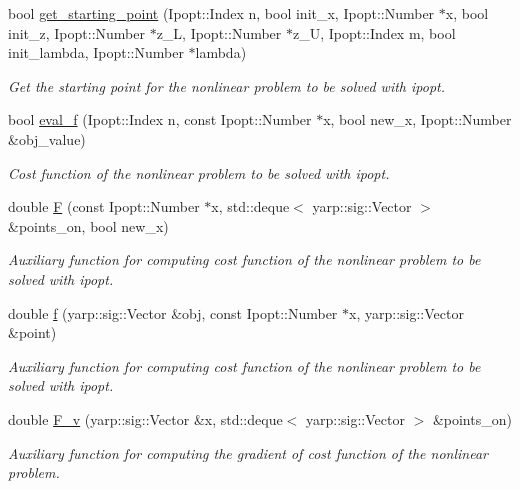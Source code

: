 \begin{DoxyCompactItemize}
bool \hyperlink{classgrasping__NLP_aad767e5f7e77a811e11817ff1d3d179e}{get\+\_\+starting\+\_\+point} (Ipopt\+::\+Index n, bool init\+\_\+x, Ipopt\+::\+Number $\ast$x, bool init\+\_\+z, Ipopt\+::\+Number $\ast$z\+\_\+L, Ipopt\+::\+Number $\ast$z\+\_\+U, Ipopt\+::\+Index m, bool init\+\_\+lambda, Ipopt\+::\+Number $\ast$lambda)
\begin{DoxyCompactList}\small\item\em Get the starting point for the nonlinear problem to be solved with ipopt. \end{DoxyCompactList}\item 
bool \hyperlink{classgrasping__NLP_aaceeaa1991c241e731f12434f3acb44c}{eval\+\_\+f} (Ipopt\+::\+Index n, const Ipopt\+::\+Number $\ast$x, bool new\+\_\+x, Ipopt\+::\+Number \&obj\+\_\+value)
\begin{DoxyCompactList}\small\item\em Cost function of the nonlinear problem to be solved with ipopt. \end{DoxyCompactList}\item 
double \hyperlink{classgrasping__NLP_a1ed524c1fd216594e82a6b066c59ff9c}{F} (const Ipopt\+::\+Number $\ast$x, std\+::deque$<$ yarp\+::sig\+::\+Vector $>$ \&points\+\_\+on, bool new\+\_\+x)
\begin{DoxyCompactList}\small\item\em Auxiliary function for computing cost function of the nonlinear problem to be solved with ipopt. \end{DoxyCompactList}\item 
double \hyperlink{classgrasping__NLP_a88efaceff4a2274a91e13dcc95ad46d1}{f} (yarp\+::sig\+::\+Vector \&obj, const Ipopt\+::\+Number $\ast$x, yarp\+::sig\+::\+Vector \&point)
\begin{DoxyCompactList}\small\item\em Auxiliary function for computing cost function of the nonlinear problem to be solved with ipopt. \end{DoxyCompactList}\item 
double \hyperlink{classgrasping__NLP_aa9ba169c71508e72c011cc43e94b1fed}{F\+\_\+v} (yarp\+::sig\+::\+Vector \&x, std\+::deque$<$ yarp\+::sig\+::\+Vector $>$ \&points\+\_\+on)
\begin{DoxyCompactList}\small\item\em Auxiliary function for computing the gradient of cost function of the nonlinear problem. \end{DoxyCompactList}\item 

\end{DoxyCompactItemize}
